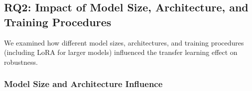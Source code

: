 \documentclass{article}
\begin{document}






\subsection{RQ2: Impact of Model Size, Architecture, and Training Procedures}
We examined how different model sizes, architectures, and training procedures (including LoRA for larger models) influenced the transfer learning effect on robustness.



\subsubsection{Model Size and Architecture Influence}
\end{document}
